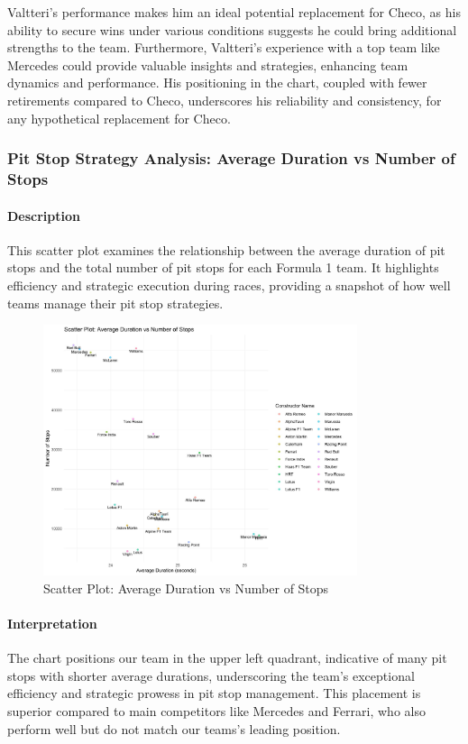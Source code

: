 \documentclass{article}
\begin{document}
Valtteri's performance makes him an ideal potential replacement for Checo, as his ability to secure wins under various conditions suggests he could bring additional strengths to the team. Furthermore, Valtteri's experience with a top team like Mercedes could provide valuable insights and strategies, enhancing team dynamics and performance. His positioning in the chart, coupled with fewer retirements compared to Checo, underscores his reliability and consistency, for any hypothetical replacement for Checo.

\subsubsection{Pit Stop Strategy Analysis: Average Duration vs Number of Stops}

\paragraph{Description}
This scatter plot examines the relationship between the average duration of pit stops and the total number of pit stops for each Formula 1 team. It highlights efficiency and strategic execution during races, providing a snapshot of how well teams manage their pit stop strategies.

\begin{figure}[H]
    \centering
    \includegraphics[width=0.82\textwidth]{images/querie/pitStopStrategy.jpeg}
    \caption{Scatter Plot: Average Duration vs Number of Stops}
\end{figure}

\paragraph{Interpretation}
The chart positions our team in the upper left quadrant, indicative of many pit stops with shorter average durations, underscoring the team's exceptional efficiency and strategic prowess in pit stop management. This placement is superior compared to main competitors like Mercedes and Ferrari, who also perform well but do not match our teams's leading position.
\end{document}
